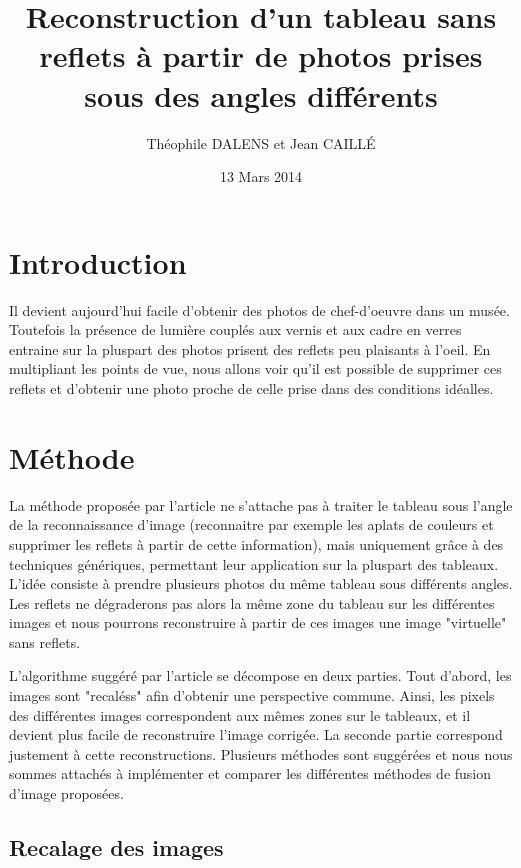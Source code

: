 \documentclass[12pt,a4paper]{article}
\title{Reconstruction d'un tableau sans reflets à partir de photos prises sous des angles différents}
\date{13 Mars 2014}
\author{Théophile DALENS et Jean CAILLÉ}
\begin{document}
\maketitle

\section{Introduction}
Il devient aujourd'hui facile d'obtenir des photos de chef-d'oeuvre dans un musée. Toutefois la présence de lumière couplés aux vernis et aux cadre en verres entraine sur la pluspart des photos prisent des reflets peu plaisants à l'oeil. En multipliant les points de vue, nous allons voir qu'il est possible de supprimer ces reflets et d'obtenir une photo proche de celle prise dans des conditions idéalles.

\section{Méthode}

La méthode proposée par l'article ne s'attache pas à traiter le tableau sous l'angle de la reconnaissance d'image (reconnaitre par exemple les aplats de couleurs et supprimer les reflets à partir de cette information), mais uniquement grâce à des techniques génériques, permettant leur application sur la pluspart des tableaux. L'idée consiste à prendre plusieurs photos du même tableau sous différents angles. Les reflets ne dégraderons pas alors la même zone du tableau sur les différentes images et nous pourrons reconstruire à partir de ces images une image "virtuelle" sans reflets.

L'algorithme suggéré par l'article se décompose en deux parties. Tout d'abord, les images sont "recaléss" afin d'obtenir une perspective commune. Ainsi, les pixels des différentes images correspondent aux mêmes zones sur le tableaux, et il devient plus facile de reconstruire l'image corrigée. La seconde partie correspond justement à cette reconstructions. Plusieurs méthodes sont suggérées et nous nous sommes attachés à implémenter et comparer les différentes méthodes de fusion d'image proposées.

\subsection{Recalage des images}
\end{document}
